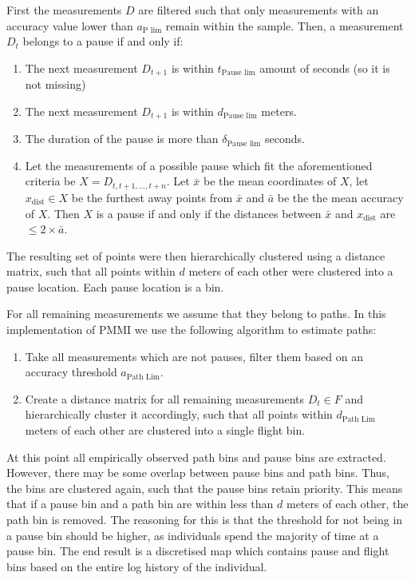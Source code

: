 \documentclass[man]{apa6}
\providecommand{\tightlist}{%
  \setlength{\itemsep}{0pt}\setlength{\parskip}{0pt}}
\theoremstyle{definition}
\theoremstyle{definition}
\theoremstyle{definition}
\theoremstyle{remark}
\begin{document}
First the measurements \(D\) are filtered such that only measurements
with an accuracy value lower than \(a_{\text{P lim}}\) remain within the
sample. Then, a measurement \(D_t\) belongs to a pause if and only if:

\begin{enumerate}
\def\labelenumi{\arabic{enumi}.}
\tightlist
\item
  The next measurement \(D_{t+1}\) is within \(t_{\text{Pause lim}}\)
  amount of seconds (so it is not missing)
\item
  The next measurement \(D_{t+1}\) is within \(d_{\text{Pause lim}}\)
  meters.
\item
  The duration of the pause is more than \(\delta_{\text{Pause lim}}\)
  seconds.
\item
  Let the measurements of a possible pause which fit the aforementioned
  criteria be \(X = D_{t,t+1,...,t+n}\). Let \(\bar{x}\) be the mean
  coordinates of \(X\), let \(x_{\text{dist}} \in X\) be the furthest
  away points from \(\bar{x}\) and \(\bar{a}\) be the the mean accuracy
  of \(X\). Then \(X\) is a pause if and only if the distances between
  \(\bar{x}\) and \(x_{\text{dist}}\) are \(\leq 2 \times \bar{a}\).
\end{enumerate}

The resulting set of points were then hierarchically clustered using a
distance matrix, such that all points within \(d\) meters of each other
were clustered into a pause location. Each pause location is a bin.

For all remaining measurements we assume that they belong to paths. In
this implementation of PMMI we use the following algorithm to estimate
paths:

\begin{enumerate}
\def\labelenumi{\arabic{enumi}.}
\tightlist
\item
  Take all measurements which are not pauses, filter them based on an
  accuracy threshold \(a_{\text{Path Lim}}\).
\item
  Create a distance matrix for all remaining measurements \(D_t \in F\)
  and hierarchically cluster it accordingly, such that all points within
  \(d_{\text{Path Lim}}\) meters of each other are clustered into a
  single flight bin.
\end{enumerate}

At this point all empirically observed path bins and pause bins are
extracted. However, there may be some overlap between pause bins and
path bins. Thus, the bins are clustered again, such that the pause bins
retain priority. This means that if a pause bin and a path bin are
within less than \(d\) meters of each other, the path bin is removed.
The reasoning for this is that the threshold for not being in a pause
bin should be higher, as individuals spend the majority of time at a
pause bin. The end result is a discretised map which contains pause and
flight bins based on the entire log history of the individual.
\end{document}
